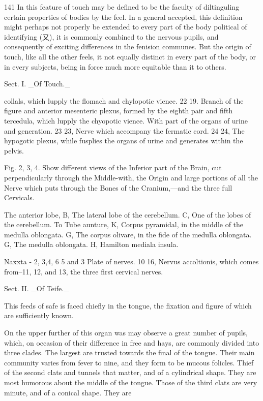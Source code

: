\documentclass{article}
\begin{document}
141 In this feature of touch may be defined to be the faculty of diltinguling certain properties of bodies by the feel. In a general accepted, this definition might perhaps not properly be extended to every part of the body political of identifying (又), it is commonly combined to the nervous pupils, and consequently of exciting differences in the fenision communes. But the origin of touch, like all the other feels, it not equally distinct in every part of the body, or in every subjects, being in force much more equitable than it to others.

Sect. I. \_Of Touch.\_

collals, which lupply the flomach and chylopotic vience. 22 19. Branch of the figure and anterior mesenteric plexus, formed by the eighth pair and fifth tercedula, which lupply the chyopotic vience. With part of the organs of urine and generation. 23 23, Nerve which accompany the fermatic cord. 24 24, The hypogotic plexus, while fusplies the organs of urine and generates within the pelvis.

Fig. 2, 3, 4. Show different views of the Inferior part of the Brain, cut perpendicularly through the Middle-with, the Origin and large portions of all the Nerve which puts through the Bones of the Cranium,—and the three full Cervicals.

The anterior lobe, B, The lateral lobe of the cerebellum. C, One of the lobes of the cerebellum. To Tube aunture, K, Corpus pyramidal, in the middle of the medulla oblongata. G, The corpus olivare, in the fide of the medulla oblongata. G, The medulla oblongata. H, Hamilton mediala insula.

Naxxta - 2, 3,4, 6 5 and 3 Plate of nerves. 10 16, Nervus accoltionis, which comes from--11, 12, and 13, the three first cervical nerves.

Sect. II. \_Of Teife.\_

This feeds of safe is faced chiefly in the tongue, the fixation and figure of which are sufficiently known.

On the upper further of this organ was may observe a great number of pupils, which, on occasion of their difference in free and hays, are commonly divided into three clades. The largest are trusted towards the final of the tongue. Their main community varies from fever to nine, and they form to be mucous folicles. Thief of the second clats and tunnels that matter, and of a cylindrical shape. They are most humorous about the middle of the tongue. Those of the third clats are very minute, and of a conical shape. They are
\end{document}
